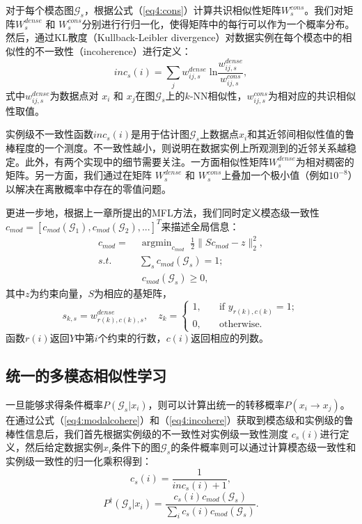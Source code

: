 对于每个模态图$\mathcal{G}_s$，根据公式（\ref{eq4:cons}）计算共识相似性矩阵${W}^{cons}_s$。我们对矩阵${W}_s^{dense}$ 和 ${W}_s^{cons}$分别进行行归一化，使得矩阵中的每行可以作为一个概率分布。然后，通过KL散度（Kullback-Leibler divergence）对数据实例在每个模态中的相似性的不一致性（incoherence）进行定义：
\begin{equation}
inc_s(i) = \sum_j {w}^{dense}_{ij,s}\;\text{ln}\frac{{w}^{dense}_{ij,s}}{{w}^{cons}_{ij,s}}, 
\label{eq4:incohere}
\end{equation}
式中${w}^{dense}_{ij,s}$为数据点对 $x_i$ 和 $x_j$在图$\mathcal{G}_s$上的$k$-NN相似性，${w}^{cons}_{ij,s}$为相对应的共识相似性取值。

实例级不一致性函数$inc_s(i)$是用于估计图$\mathcal{G}_s$上数据点$x_i$和其近邻间相似性值的鲁棒程度的一个测度。不一致性越小，则说明在数据实例上所观测到的近邻关系越稳定。此外，有两个实现中的细节需要关注。一方面相似性矩阵${W}^{dense}_s$为相对稠密的矩阵。另一方面，我们通过在矩阵 ${W}_s^{dense}$ 和 ${W}_s^{cons}$上叠加一个极小值（例如$10^{-8}$）以解决在离散概率中存在的零值问题。

更进一步地，根据上一章所提出的MFL方法，我们同时定义模态级一致性$ {c}_{mod} = [c_{mod}(\mathcal{G}_1), c_{mod}(\mathcal{G}_2),...]^T $来描述全局信息：
\begin{equation}
\begin{split}
{c}_{mod} = \;&\mathop{\mathrm{argmin}}_{{c}_{mod}}\; \frac{1}{2}\|{S}{c}_{mod} - {z}  \|_2^2, \\
s.t.\quad&\sum_{s} c_{mod}(\mathcal{G}_s) = 1;\\ &\; c_{mod}(\mathcal{G}_s) \ge 0,
\end{split}
\label{eq4:modalcohere}
\end{equation}
其中$z$为约束向量，$S$为相应的基矩阵， 
\begin{equation}
{s}_{k,s} =  {w}^{dense}_{r(k), c(k), s}, \quad  {z}_k = \begin{cases}1,\quad &\text{if }  {y}_{r(k),c(k)} =1; \\
0, \quad &\text{otherwise}.
\end{cases}
\end{equation}
函数$ r(i) $返回$Y$中第$i$个约束的行数，$ c(i) $返回相应的列数。

\subsection{统一的多模态相似性学习}
一旦能够求得条件概率$P(\mathcal{G}_s|x_i)$，则可以计算出统一的转移概率$ P(x_i\rightarrow x_j) $。在通过公式（\ref{eq4:modalcohere}）和（\ref{eq4:incohere}）获取到模态级和实例级的鲁棒性信息后，我们首先根据实例级的不一致性对实例级一致性测度 $ c_s(i) $进行定义，然后给定数据实例$x_i$条件下的图$\mathcal{G}_s$的条件概率则可以通过计算模态级一致性和实例级一致性的归一化乘积得到：
\begin{equation}
c_s(i) = \frac{1}{inc_s(i)+1}
\label{eq4:cohere},
\end{equation}
\begin{equation}
P^\dagger (\mathcal{G}_s|x_i) = \frac{c_s(i) c_{mod}(\mathcal{G}_s)}{\sum_i c_s(i) c_{mod}(\mathcal{G}_s)}
\label{eq4:Pglu}.
\end{equation}

